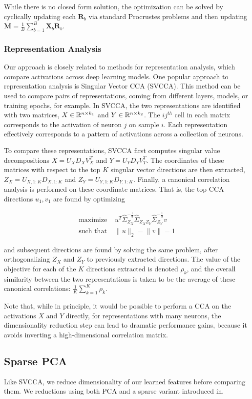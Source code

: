 While there is no closed form solution, the optimization can be solved by cyclically updating each $\mathbf{R}_{b}$ via standard Procrustes problems and then updating $\mathbf{M} = \frac{1}{B} \sum_{b = 1}^{B} \mathbf{X}_{b} \mathbf{R}_{b}$.

\subsubsection{Representation Analysis}

Our approach is closely related to methods for representation analysis, which
compare activations across deep learning models. One popular approach to
representation analysis is Singular Vector CCA (SVCCA). This method can be used
to compare pairs of representations, coming from different layers, models, or
training epochs, for example. In SVCCA, the two representations are identified
with two matrices, $X \in \mathbb{R}^{n \times k_{1}}$ and $Y \in \mathbb{R}^{n \times
  k_{2}}$. The $ij^{th}$ cell in each matrix corresponds to the activation of
neuron $j$ on sample $i$. Each representation effectively corresponds to a
pattern of activations across a collection of neurons.

To compare these representations, SVCCA first computes singular value
decompositions $X = U_{X}D_{X}V_{X}^{T}$ and $Y = U_{Y}D_{Y}V_{T}^{T}$. The
coordinates of these matrices with respect to the top $K$ singular vector
directions are then extracted, $Z_{X} = U_{X, 1:K}D_{X, 1:K}$ and $Z_{Y} = U_{Y,
  1:K}D_{Y, 1:K}$. Finally, a canonical correlation analysis is performed on
these coordinate matrices. That is, the top CCA directions $u_{1}, v_{1}$ are
found by optimizing

\begin{align*}
  \text{maximize }& u^{T}\hat{\Sigma}_{Z_{X}}^{-\frac{1}{2}}\hat{\Sigma}_{Z_{X}Z_{Y}}\hat{\Sigma}_{Z_{Y}}^{-\frac{1}{2}}v \\
  \text{such that } & \|u\|_{2} = \|v\| = 1
\end{align*}

and subsequent directions are found by solving the same problem, after
orthogonalizing $Z_{X}$ and $Z_{Y}$ to previously extracted directions. The
value of the objective for each of the $K$ directions extracted is denoted
$\rho_{k}$, and the overall similarity between the two representations is taken
to be the average of these canonical correlations: $\frac{1}{K}\sum_{k = 1}^{K}
\rho_{k}$.

Note that, while in principle, it would be possible to perform a CCA on the
activations $X$ and $Y$ directly, for representations with many neurons, the
dimensionality reduction step can lead to dramatic performance gains, because it
avoids inverting a high-dimensional correlation matrix.

\subsection{Sparse PCA}

Like SVCCA, we reduce dimensionality of our learned features before comparing
them. We reductions using both PCA and a sparse variant introduced in.

